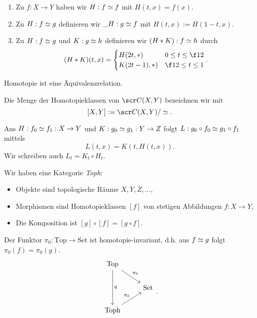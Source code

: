 \begin{df}
	\begin{enumerate}[(1)]
		\item
			Zu $f: X \to Y$ haben wir $H: f \simeq f$ mit $H(t,x) = f(x)$.
		\item
			Zu $H: f \simeq g$ definieren wir $\_H: g \simeq f$ mit $H(t,x) := H(1-t,x)$.
		\item
			Zu $H: f \simeq g$ und $K: g\simeq h$ definieren wir $(H \ast K) : f \simeq h$ durch
			\[
				(H \ast K)(t,x) = \begin{cases}
					H(2t, \ast) & 0 \le t \le \f 12 \\
					K(2t-1), \ast) & \f 12 \le t \le 1
				\end{cases}.
			\]
	\end{enumerate}
	Homotopie ist eine Äquivalenzrelation.
\end{df}

\begin{df}
	Die Menge der Homotopieklassen von $\scr C(X, Y)$ bezeichnen wir mit
	\[
		[X,Y] := \scr C(X, Y) / \homotopic.
	\]
\end{df}

\begin{st}
	Aus $H: f_0 \simeq f_1 : X \to Y$ und $K: g_0 \simeq g_1: Y \to Z$ folgt $L: g_0 \circ f_0 \simeq g_1 \circ f_1$ mittels
	\[
		L(t, x) = K(t, H(t,x)).
	\]
	Wir schreiben auch $L_t = K_t \circ H_t$.
\end{st}

\begin{kor}
	Wir haben eine Kategorie \emph{Toph}:
	\begin{itemize}
		\item
			Objekte sind topologische Räume $X, Y, Z, \dotsc $,
		\item
			Morphismen sind Homotopieklassen $[f]$ von stetigen Abbildungen $f: X \to Y$,
		\item
			Die Komposition ist $[g] \circ [f] = [g\circ f]$.
	\end{itemize}
\end{kor}

\begin{st}
	Der Funktor $\pi_0: \mathrm{Top} \to \mathrm{Set}$ ist homotopie-invariant, d.h. aus $f \simeq g$ folgt $\pi_0(f) = \pi_0(g)$.
	\[
		\begin{tikzcd}
			\mathrm{Top} \arrow{dr}{\pi_0} \arrow{dd}{q} & \\
			& \mathrm{Set} \\
			\mathrm{Toph} \arrow{ur}{\pi_0} & \\
		\end{tikzcd}.
	\]
\end{st}

